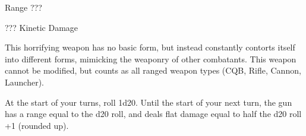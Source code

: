 Range ???
 
??? Kinetic Damage
 

This horrifying weapon has no basic form, but instead constantly contorts itself into different  
forms, mimicking the weaponry of other combatants. This weapon cannot be modified, but  
counts as all ranged weapon types (CQB, Rifle, Cannon, Launcher). 
 

At the start of your turns, roll 1d20. Until the start of your next turn, the gun has a range equal to  
the d20 roll, and deals flat damage equal to half the d20 roll +1 (rounded up).
 

                                                                                                                 

